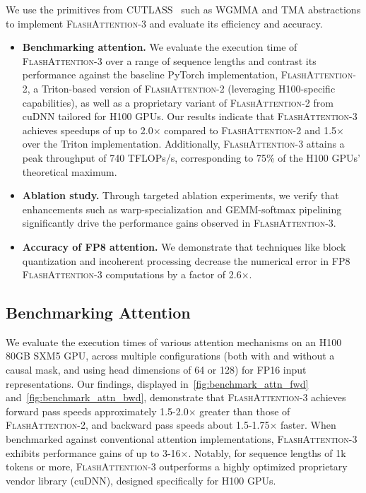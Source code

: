 We use the primitives from CUTLASS~\citep{Thakkar_CUTLASS_2023} such as WGMMA and TMA abstractions to implement \textsc{FlashAttention-3} and evaluate its efficiency and accuracy.

\begin{itemize}

\item \textbf{Benchmarking attention.} We evaluate the execution time of \textsc{FlashAttention-3} over a range of sequence lengths and contrast its performance against the baseline PyTorch implementation, \textsc{FlashAttention-2}, a Triton-based version of \textsc{FlashAttention-2} (leveraging H100-specific capabilities), as well as a proprietary variant of \textsc{FlashAttention-2} from cuDNN tailored for H100 GPUs. Our results indicate that \textsc{FlashAttention-3} achieves speedups of up to 2.0$\times$ compared to \textsc{FlashAttention-2} and 1.5$\times$ over the Triton implementation. Additionally, \textsc{FlashAttention-3} attains a peak throughput of 740 TFLOPs/s, corresponding to 75\% of the H100 GPUs’ theoretical maximum.
\item \textbf{Ablation study.} Through targeted ablation experiments, we verify that enhancements such as warp-specialization and GEMM-softmax pipelining significantly drive the performance gains observed in \textsc{FlashAttention-3}.
\item \textbf{Accuracy of FP8 attention.} We demonstrate that techniques like block quantization and incoherent processing decrease the numerical error in FP8 \textsc{FlashAttention-3} computations by a factor of 2.6$\times$.
\end{itemize}

\subsection{Benchmarking Attention}
\label{subsec:benchmark_attn}

We evaluate the execution times of various attention mechanisms on an H100 80GB SXM5 GPU, across multiple configurations (both with and without a causal mask, and using head dimensions of 64 or 128) for FP16 input representations. Our findings, displayed in~\cref{fig:benchmark_attn_fwd} and~\cref{fig:benchmark_attn_bwd}, demonstrate that \textsc{FlashAttention-3} achieves forward pass speeds approximately 1.5-2.0$\times$ greater than those of \textsc{FlashAttention-2}, and backward pass speeds about 1.5-1.75$\times$ faster. When benchmarked against conventional attention implementations, \textsc{FlashAttention-3} exhibits performance gains of up to 3-16$\times$. Notably, for sequence lengths of 1k tokens or more, \textsc{FlashAttention-3} outperforms a highly optimized proprietary vendor library (cuDNN), designed specifically for H100 GPUs.

